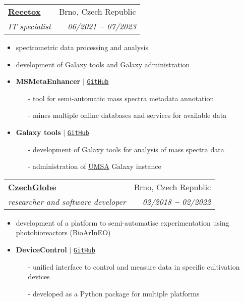 \documentclass[letterpaper,11pt]{article}
\makeatletter
\newcommand{\resumeSubheading}[4]{
  \vspace{-2pt}\item
    \begin{tabular*}{0.97\textwidth}[t]{l@{\extracolsep{\fill}}r}
      \textbf{#1} & #2 \\
      \textit{\small#3} & \textit{\small #4} \\
    \end{tabular*}\vspace{-7pt}
}
\makeatother
\begin{document}
  \resumeSubheading
  {\href{https://www.recetox.muni.cz/en/services/data-services-1/spectrometric-data-processing-and-analysis}{Recetox}}{Brno, Czech Republic}
  {IT specialist}{06/2021 \textbf{--} 07/2023}
  \small{
    \begin{itemize}
      \item spectrometric data processing and analysis
      \item development of Galaxy tools and Galaxy administration
      \item \textbf{MSMetaEnhancer} $|$ \href{https://github.com/RECETOX/MSMetaEnhancer}{\color{blue}\texttt{GitHub}} \vspace{-2pt}
      \begin{itemize}
        \item[-] tool for semi-automatic mass spectra metadata annotation \vspace{-2pt}
        \item[-] mines multiple online databases and services for available data \vspace{-2pt}
      \end{itemize}
      \item \textbf{Galaxy tools} $|$ \href{https://github.com/RECETOX/galaxytools}{\color{blue}\texttt{GitHub}} \vspace{-2pt}
      \begin{itemize}
        \item[-] development of Galaxy tools for analysis of mass spectra data \vspace{-2pt}
        \item[-] administration of \href{https://umsa.cerit-sc.cz/}{UMSA} Galaxy instance \vspace{-2pt}
      \end{itemize}
    \end{itemize}
  }

  \vspace{10pt}

  \resumeSubheading
  {\href{http://czechglobe.cz/en/}{CzechGlobe}}{Brno, Czech Republic}
  {researcher and software developer}{02/2018 \textbf{--} 02/2022}
  \small{
    \begin{itemize}
      \item development of a platform to semi-automatise experimentation using photobioreactors (BioArInEO)
      \item \textbf{DeviceControl} $|$ \href{https://github.com/SmartBioTech/DeviceControl}{\color{blue}\texttt{GitHub}} \vspace{-2pt}
      \begin{itemize}
        \item[-] unified interface to control and measure data in specific cultivation devices \vspace{-2pt}
        \item[-] developed as a Python package for multiple platforms \vspace{-2pt}
      \end{itemize}
    \end{itemize}
  }
\end{document}

